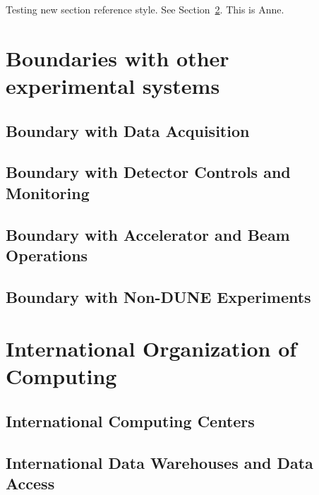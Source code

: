 Testing new section reference style. See Section~\ref{sw:ov-intl-org}. This is Anne.
\section{Boundaries with other experimental systems}
\subsection{Boundary with Data Acquisition}
\subsection{Boundary with Detector Controls and Monitoring}
\subsection{Boundary with Accelerator and Beam Operations}
\subsection{Boundary with Non-DUNE Experiments}

\section{International Organization of Computing}
\label{sw:ov-intl-org}

\subsection{International Computing Centers}
\subsection{International Data Warehouses and Data Access}
